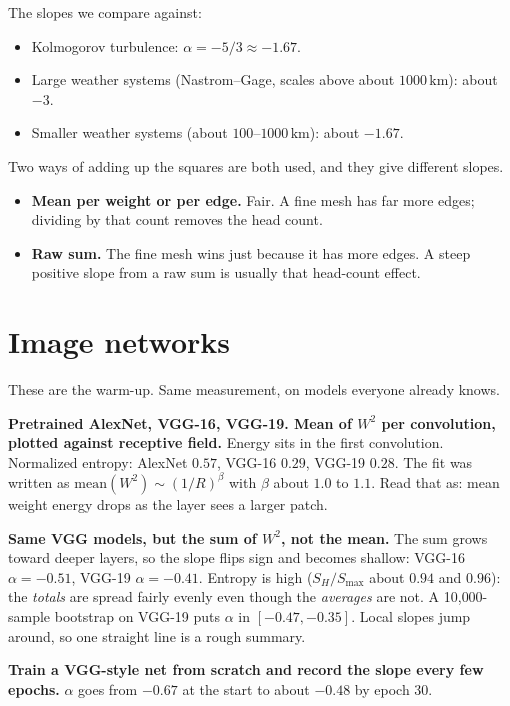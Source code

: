 \documentclass[11pt,a4paper]{article}
\begin{document}
The slopes we compare against:
\begin{itemize}
  \item Kolmogorov turbulence: \(\alpha = -5/3 \approx -1.67\).
  \item Large weather systems (Nastrom--Gage, scales above about \(1000\,\mathrm{km}\)): about \(-3\).
  \item Smaller weather systems (about \(100\)--\(1000\,\mathrm{km}\)): about \(-1.67\).
\end{itemize}

Two ways of adding up the squares are both used, and they give different slopes.
\begin{itemize}
  \item \textbf{Mean per weight or per edge.} Fair. A fine mesh has far more edges; dividing by that count removes the head count.
  \item \textbf{Raw sum.} The fine mesh wins just because it has more edges. A steep positive slope from a raw sum is usually that head-count effect.
\end{itemize}

\section*{Image networks}

These are the warm-up. Same measurement, on models everyone already knows.

\textbf{Pretrained AlexNet, VGG-16, VGG-19. Mean of \(W^2\) per convolution, plotted against receptive field.}
Energy sits in the first convolution.
Normalized entropy: AlexNet \(0.57\), VGG-16 \(0.29\), VGG-19 \(0.28\).
The fit was written as \(\mathrm{mean}(W^2) \sim (1/R)^{\beta}\) with \(\beta\) about \(1.0\) to \(1.1\).
Read that as: mean weight energy drops as the layer sees a larger patch.

\textbf{Same VGG models, but the sum of \(W^2\), not the mean.}
The sum grows toward deeper layers, so the slope flips sign and becomes shallow: VGG-16 \(\alpha = -0.51\), VGG-19 \(\alpha = -0.41\).
Entropy is high (\(S_H/S_{\max}\) about \(0.94\) and \(0.96\)): the \emph{totals} are spread fairly evenly even though the \emph{averages} are not.
A 10{,}000-sample bootstrap on VGG-19 puts \(\alpha\) in \([-0.47,-0.35]\).
Local slopes jump around, so one straight line is a rough summary.

\textbf{Train a VGG-style net from scratch and record the slope every few epochs.}
\(\alpha\) goes from \(-0.67\) at the start to about \(-0.48\) by epoch 30.
\end{document}
